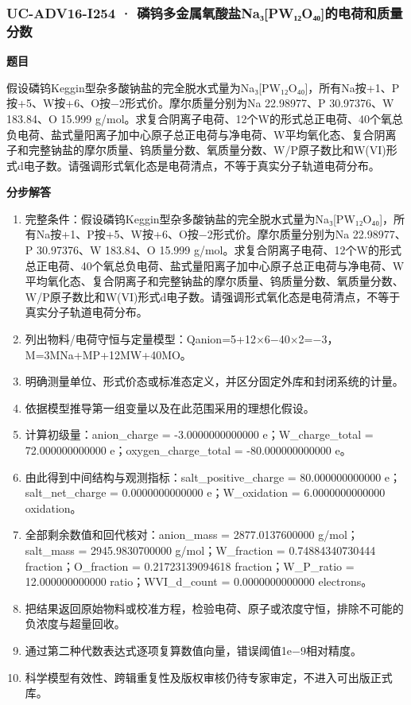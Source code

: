 \documentclass[UTF8,11pt,a4paper]{ctexart}
\begin{document}
\subsubsection*{UC-ADV16-I254 · 磷钨多金属氧酸盐Na₃[PW₁₂O₄₀]的电荷和质量分数}
\noindent\textbf{题目}\par
假设磷钨Keggin型杂多酸钠盐的完全脱水式量为Na₃[PW₁₂O₄₀]，所有Na按+1、P按+5、W按+6、O按−2形式价。摩尔质量分别为Na 22.98977、P 30.97376、W 183.84、O 15.999 g/mol。求复合阴离子电荷、12个W的形式总正电荷、40个氧总负电荷、盐式量阳离子加中心原子总正电荷与净电荷、W平均氧化态、复合阴离子和完整钠盐的摩尔质量、钨质量分数、氧质量分数、W/P原子数比和W(VI)形式d电子数。请强调形式氧化态是电荷清点，不等于真实分子轨道电荷分布。\par
\medskip\noindent\textbf{分步解答}
\begin{enumerate}
\item 完整条件：假设磷钨Keggin型杂多酸钠盐的完全脱水式量为Na₃[PW₁₂O₄₀]，所有Na按+1、P按+5、W按+6、O按−2形式价。摩尔质量分别为Na 22.98977、P 30.97376、W 183.84、O 15.999 g/mol。求复合阴离子电荷、12个W的形式总正电荷、40个氧总负电荷、盐式量阳离子加中心原子总正电荷与净电荷、W平均氧化态、复合阴离子和完整钠盐的摩尔质量、钨质量分数、氧质量分数、W/P原子数比和W(VI)形式d电子数。请强调形式氧化态是电荷清点，不等于真实分子轨道电荷分布。
\item 列出物料/电荷守恒与定量模型：Qanion=5+12×6−40×2=−3，M=3MNa+MP+12MW+40MO。
\item 明确测量单位、形式价态或标准态定义，并区分固定外库和封闭系统的计量。
\item 依据模型推导第一组变量以及在此范围采用的理想化假设。
\item 计算初级量：anion\_charge = -3.0000000000000 e；W\_charge\_total = 72.000000000000 e；oxygen\_charge\_total = -80.000000000000 e。
\item 由此得到中间结构与观测指标：salt\_positive\_charge = 80.000000000000 e；salt\_net\_charge = 0.0000000000000 e；W\_oxidation = 6.0000000000000 oxidation。
\item 全部剩余数值和回代核对：anion\_mass = 2877.0137600000 g/mol；salt\_mass = 2945.9830700000 g/mol；W\_fraction = 0.74884340730444 fraction；O\_fraction = 0.21723139094618 fraction；W\_P\_ratio = 12.000000000000 ratio；WVI\_d\_count = 0.0000000000000 electrons。
\item 把结果返回原始物料或校准方程，检验电荷、原子或浓度守恒，排除不可能的负浓度与超量回收。
\item 通过第二种代数表达式逐项复算数值向量，错误阈值1e−9相对精度。
\item 科学模型有效性、跨辑重复性及版权审核仍待专家审定，不进入可出版正式库。
\end{enumerate}
\end{document}
